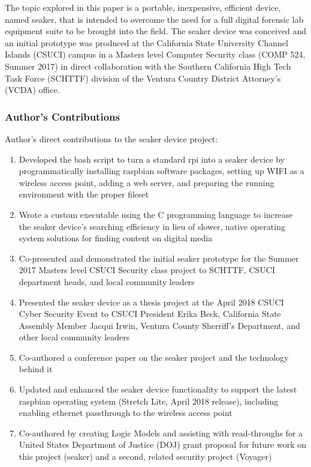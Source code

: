 \documentclass[12pt]{article}
\begin{document}
The topic explored in this paper is a portable, inexpensive, efficient device, named \gls{seaker},
that is intended
to overcome the need for a full digital
forensic lab equipment suite to be brought into the field.  The \gls{seaker} device was conceived and 
an initial prototype was produced at the California State University Channel Islands (CSUCI)
campus in a 
Masters level Computer Security class (COMP 524, Summer 2017) in direct collaboration with the
Southern California High Tech Task Force (SCHTTF) division of the Ventura Country
District Attorney's (VCDA) office.\\


\subsubsection{Author's Contributions}
Author's direct contributions to the \gls{seaker} device project:
\begin{enumerate}
  \item Developed the bash script to turn a standard \gls{rpi} into a
  \gls{seaker} device by programmatically
  installing raspbian software packages, setting up WIFI as a wireless access point, adding a web server,
  and preparing the running environment with the proper fileset
  \item Wrote a custom executable using the C programming language to increase the \gls{seaker} device's 
  searching efficiency in lieu of slower, native operating
  system solutions for finding content on digital media
  \item Co-presented and demonstrated the initial \gls{seaker} prototype for the Summer 2017 Masters level CSUCI
  Security class project to SCHTTF, CSUCI department heads, and local community leaders
  \item Presented the \gls{seaker} device as a thesis project at the April 2018 CSUCI Cyber Security Event
  to CSUCI President
  Erika Beck, California State Assembly Member Jacqui Irwin, Ventura County Sherriff's Department,
  and other local community leaders
  \item Co-authored a conference paper on the \gls{seaker} project and the technology behind it
  \item Updated and enhanced the \gls{seaker} device functionality to support the latest raspbian operating system (Stretch
  Lite, April 2018 release), including enabling ethernet passthrough to the wireless access point
  \item Co-authored by creating Logic Models and assisting with read-throughs for a United States
  Department of Justice (DOJ)
  grant proposal for future work on this project (\gls{seaker}) and
  a second, related security project (Voyager)
\end{enumerate}
\end{document}

